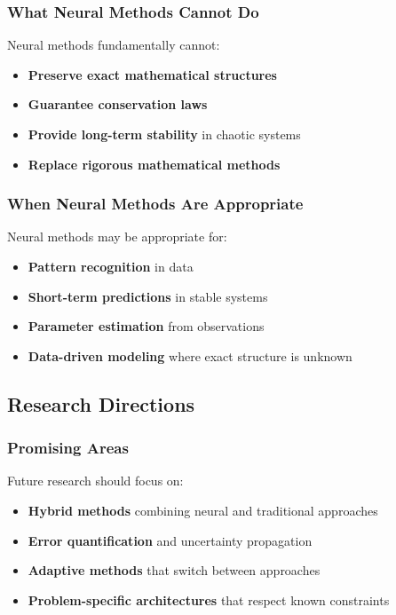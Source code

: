 \documentclass[11pt,a4paper]{article}
\begin{document}
\subsubsection{What Neural Methods Cannot Do}

Neural methods fundamentally cannot:
\begin{itemize}
    \item \textbf{Preserve exact mathematical structures}
    \item \textbf{Guarantee conservation laws}
    \item \textbf{Provide long-term stability} in chaotic systems
    \item \textbf{Replace rigorous mathematical methods}
\end{itemize}

\subsubsection{When Neural Methods Are Appropriate}

Neural methods may be appropriate for:
\begin{itemize}
    \item \textbf{Pattern recognition} in data
    \item \textbf{Short-term predictions} in stable systems
    \item \textbf{Parameter estimation} from observations
    \item \textbf{Data-driven modeling} where exact structure is unknown
\end{itemize}

\subsection{Research Directions}

\subsubsection{Promising Areas}

Future research should focus on:
\begin{itemize}
    \item \textbf{Hybrid methods} combining neural and traditional approaches
    \item \textbf{Error quantification} and uncertainty propagation
    \item \textbf{Adaptive methods} that switch between approaches
    \item \textbf{Problem-specific architectures} that respect known constraints
\end{itemize}
\end{document}
